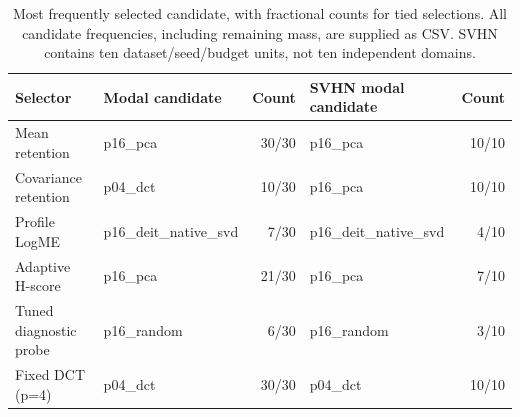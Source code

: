 \begin{table}[tb]\centering\small
\caption{Most frequently selected candidate, with fractional counts for tied selections. All candidate frequencies, including remaining mass, are supplied as CSV. SVHN contains ten dataset/seed/budget units, not ten independent domains.}\label{tab:frequencies}
\begin{tabular}{llrlr}\toprule
Selector & Modal candidate & Count & SVHN modal candidate & Count\\\midrule
Mean retention & p16\_pca & 30/30 & p16\_pca & 10/10\\
Covariance retention & p04\_dct & 10/30 & p16\_pca & 10/10\\
Profile LogME & p16\_deit\_native\_svd & 7/30 & p16\_deit\_native\_svd & 4/10\\
Adaptive H-score & p16\_pca & 21/30 & p16\_pca & 7/10\\
Tuned diagnostic probe & p16\_random & 6/30 & p16\_random & 3/10\\
Fixed DCT (p=4) & p04\_dct & 30/30 & p04\_dct & 10/10\\
\bottomrule\end{tabular}
\end{table}
